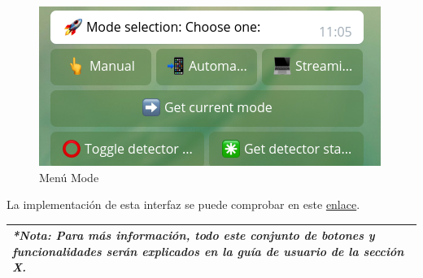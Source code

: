 \begin{figure}[h]
	\centering
	\includegraphics[scale=0.8]{images/39}
	\caption{Menú Mode}
\end{figure}

La implementación de esta interfaz se puede comprobar en este \href{https://github.com/jmv74211/TFM_security_system_PI/blob/master/src/agents/telegram_bot.py#L972}{enlace}.

\begin{tabular}{|p{15.5cm}|}
	
	\hline
	
	\textit{ \textbf{*Nota:} Para más información, todo este conjunto de botones y funcionalidades serán explicados en la guía de usuario de la sección X. }
	\\
	\hline
	
\end{tabular}

\newpage
